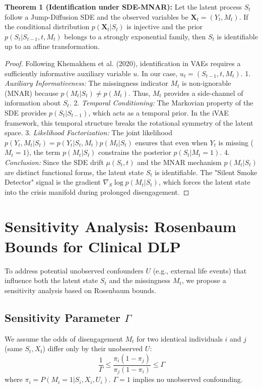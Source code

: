 \documentclass{article}
\begin{document}
\textbf{Theorem 1 (Identification under SDE-MNAR):}
Let the latent process $S_t$ follow a Jump-Diffusion SDE and the observed variables be $\mathbf{X}_t = (Y_t, M_t)$. If the conditional distribution $p(\mathbf{X}_t | S_t)$ is injective and the prior $p(S_t | S_{t-1}, t, M_t)$ belongs to a strongly exponential family, then $S_t$ is identifiable up to an affine transformation.

\begin{proof}
Following Khemakhem et al. (2020), identification in VAEs requires a sufficiently informative auxiliary variable $u$. In our case, $u_t = (S_{t-1}, t, M_t)$.
1. \textit{Auxiliary Informativeness:} The missingness indicator $M_t$ is non-ignorable (MNAR) because $p(M_t | S_t) \neq p(M_t)$. Thus, $M_t$ provides a side-channel of information about $S_t$.
2. \textit{Temporal Conditioning:} The Markovian property of the SDE provides $p(S_t | S_{t-1})$, which acts as a temporal prior. In the iVAE framework, this temporal structure breaks the rotational symmetry of the latent space.
3. \textit{Likelihood Factorization:} The joint likelihood $p(Y_t, M_t | S_t) = p(Y_t | S_t, M_t) p(M_t | S_t)$ ensures that even when $Y_t$ is missing ($M_t=1$), the term $p(M_t | S_t)$ constrains the posterior $p(S_t | M_t=1)$.
4. \textit{Conclusion:} Since the SDE drift $\mu(S_t, t)$ and the MNAR mechanism $p(M_t | S_t)$ are distinct functional forms, the latent state $S_t$ is identifiable. The "Silent Smoke Detector" signal is the gradient $\nabla_{S} \log p(M_t | S_t)$, which forces the latent state into the crisis manifold during prolonged disengagement.
\end{proof}

\section{Sensitivity Analysis: Rosenbaum Bounds for Clinical DLP}

To address potential unobserved confounders $U$ (e.g., external life events) that influence both the latent state $S_t$ and the missingness $M_t$, we propose a sensitivity analysis based on Rosenbaum bounds.

\subsection{Sensitivity Parameter $\Gamma$}
We assume the odds of disengagement $M_t$ for two identical individuals $i$ and $j$ (same $S_t, X_t$) differ only by their unobserved $U$:
\begin{equation}
    \frac{1}{\Gamma} \leq \frac{\pi_i (1 - \pi_j)}{\pi_j (1 - \pi_i)} \leq \Gamma
\end{equation}
where $\pi_i = P(M_i = 1 | S_i, X_i, U_i)$. $\Gamma = 1$ implies no unobserved confounding.
\end{document}
